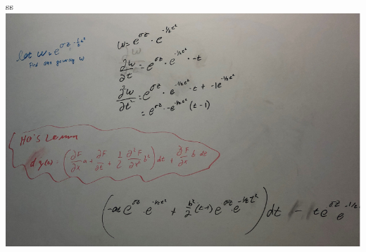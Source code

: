 \documentclass[12pt]{article}
\newenvironment{problem}[3][Problem]{\begin{trivlist}
\item[\hskip \labelsep {\bfseries #1}\hskip \labelsep {\bfseries #2.}]}{\end{trivlist}}
\begin{document}
  \begin{problem}{10} .ss \\
\includegraphics[width=\textwidth ]{mod10p10c.png}

  \end{problem}
  
\end{document}
